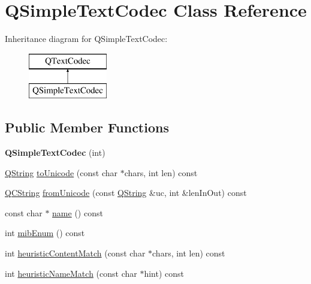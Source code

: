 \hypertarget{class_q_simple_text_codec}{}\section{Q\+Simple\+Text\+Codec Class Reference}
\label{class_q_simple_text_codec}
Inheritance diagram for Q\+Simple\+Text\+Codec\+:\begin{figure}[H]
\begin{center}
\leavevmode
\includegraphics[height=2.000000cm]{class_q_simple_text_codec}
\end{center}
\end{figure}
\subsection*{Public Member Functions}
\begin{DoxyCompactItemize}
\item 
\mbox{\label{class_q_simple_text_codec_a07b6ee6fd1488a57dfcff5e4428d841b}} 
{\bfseries Q\+Simple\+Text\+Codec} (int)
\item 
\mbox{\hyperlink{class_q_string}{Q\+String}} \mbox{\hyperlink{class_q_simple_text_codec_a750180ddce19925a1b7314423b84a612}{to\+Unicode}} (const char $\ast$chars, int len) const
\item 
\mbox{\hyperlink{class_q_c_string}{Q\+C\+String}} \mbox{\hyperlink{class_q_simple_text_codec_ac361f6788c0ef27376ed31744c0beaf4}{from\+Unicode}} (const \mbox{\hyperlink{class_q_string}{Q\+String}} \&uc, int \&len\+In\+Out) const
\item 
const char $\ast$ \mbox{\hyperlink{class_q_simple_text_codec_a4e7462d95d59b6262f201d79a392bde9}{name}} () const
\item 
int \mbox{\hyperlink{class_q_simple_text_codec_aa1617c3384f129a43dfd0edc15177eaf}{mib\+Enum}} () const
\item 
int \mbox{\hyperlink{class_q_simple_text_codec_a77599a0baeceb12a42dadcbeb9b03994}{heuristic\+Content\+Match}} (const char $\ast$chars, int len) const
\item 
int \mbox{\hyperlink{class_q_simple_text_codec_ab08ae2e5e99af1cd6dda3450731e502b}{heuristic\+Name\+Match}} (const char $\ast$hint) const
\end{DoxyCompactItemize}

